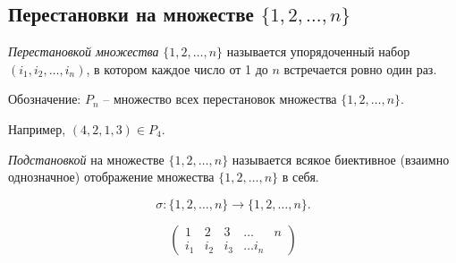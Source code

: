 \subsection{Перестановки на множестве $\{1, 2, \dots, n\}$}

\begin{definition}
    \textit{Перестановкой множества} $\{1, 2, \dots, n\}$ называется упорядоченный набор $(i_1, i_2, \dots, i_n)$, в котором каждое число от 1 до $n$ встречается ровно один раз. 
\end{definition}

Обозначение: $P_n$ -- множество всех перестановок множества $\{1, 2, \dots, n\}$.

Например, $(4, 2, 1, 3) \in P_4$.

\begin{definition}
    \textit{Подстановкой} на множестве $\{1, 2, \dots, n\}$ называется всякое биективное (взаимно однозначное) отображение множества $\{1, 2, \dots, n\}$ в себя.

    \begin{equation*}
        \sigma : \{1, 2, \dots, n\} \to \{1, 2, \dots, n\}
    .\end{equation*}

    \begin{equation*}
        \begin{pmatrix}
            1 & 2 & 3 & \dots & n \\
            i_1 & i_2 & i_3 & \dots i_n
        \end{pmatrix}
    \end{equation*}
\end{definition}
